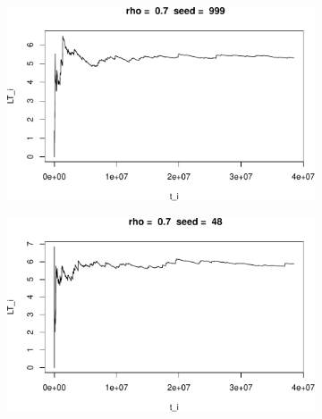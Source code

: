\documentclass[]{article}
\begin{document}
\begin{figure}[h!]
\begin{subfigure}[b]{.55\linewidth}
\includegraphics[width=\linewidth]{003_files/figure-latex/unnamed-chunk-17-5.pdf}
\end{subfigure}\hfill
\begin{subfigure}[b]{.55\linewidth}
\includegraphics[width=\linewidth]{003_files/figure-latex/unnamed-chunk-17-6.pdf}
\end{subfigure}\vfill
\end{figure}
\end{document}
